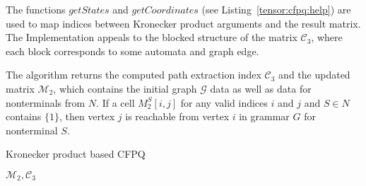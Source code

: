 The functions $getStates$ and $getCoordinates$ (see Listing~\ref{tensor:cfpq:help})
are used to map indices between Kronecker product arguments and the result matrix.
The Implementation appeals to the blocked structure of the matrix $\mathcal{C}_3$, 
where each block corresponds to some automata and graph edge.

The algorithm returns the computed path extraction index $\mathcal{C}_3$ and 
the updated matrix $\mathcal{M}_2$, which contains the initial 
graph $\mathcal{G}$ data as well as data for nonterminals from $N$.
If a cell $M_2^S[i,j]$ for any valid indices $i$ and $j$ and $S \in N$ 
contains $\{1\}$, then vertex $j$ is reachable from vertex $i$ in grammar $G$ for 
nonterminal $S$.

\begin{algorithm}[h]
\begin{algorithmic}[1]
\footnotesize
\caption{Kronecker product based CFPQ}
\label{tensor:cfpq}
            \EndFor
        \EndFor
    \EndFor
                \EndFor
            \EndIf
        \EndFor
    \EndWhile
\State \Return $\mathcal{M}_2,\mathcal{C}_3$
\EndFunction
\end{algorithmic}
\end{algorithm}

